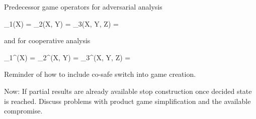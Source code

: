     Predecessor game operators for adversarial analysis

    \startformula
        \startalign[n=2,align={right,left}]
            \NC \Pre_1(X) =
            \NC {} \cup {}
            \NR
            \NC \Pre_2(X, Y) =
            \NC {} \cup {}
            \NR
            \NC \Pre_3(X, Y, Z) =
            \NC {} \cup {}
            \NR
        \stopalign
    \stopformula

    and for cooperative analysis

    \startformula
        \startalign[n=2,align={right,left}]
            \NC \Pre_1^{\Coop}(X) =
            \NC {} \cup {}
            \NR
            \NC \Pre_2^{\Coop}(X, Y) =
            \NC {} \cup {}
            \NR
            \NC \Pre_3^{\Coop}(X, Y, Z) =
            \NC {} \cup {}
            \NR
        \stopalign
    \stopformula



\stopsubsection


\startsubsection[title={Product Game Simplification}]

    Reminder of how to include co-safe switch into game creation.

    Now: If partial results are already available stop construction once decided state is reached.
    Discuss problems with product game simplification and the available compromise.

\stopsubsection

